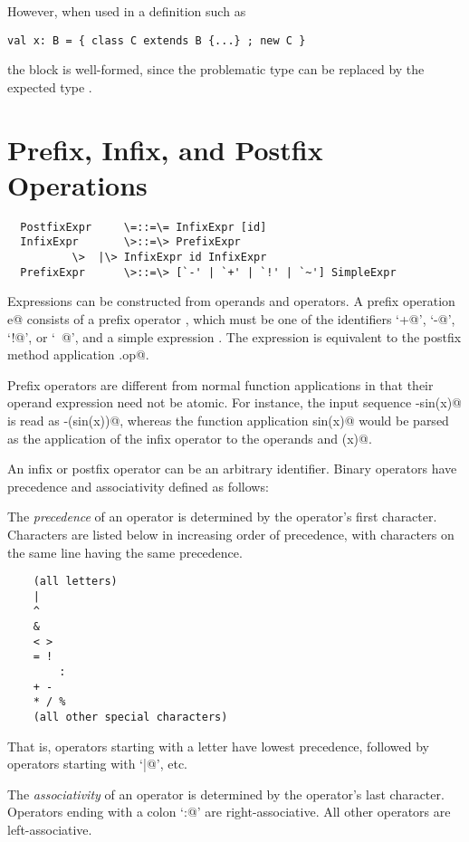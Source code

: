 \documentclass[11pt]{report}
\begin{document}
However, when used in a definition such as 
\begin{verbatim}
val x: B = { class C extends B {...} ; new C }
\end{verbatim}
the block is well-formed, since the problematic type \verb@C@ can be
replaced by the expected type \verb@B@.

\section{Prefix, Infix, and Postfix Operations}
\label{sec:infix-operations}

\syntax\begin{verbatim}
  PostfixExpr     \=::=\= InfixExpr [id]
  InfixExpr       \>::=\> PrefixExpr
		  \>  |\> InfixExpr id InfixExpr
  PrefixExpr      \>::=\> [`-' | `+' | `!' | `~'] SimpleExpr 
\end{verbatim}

Expressions can be constructed from operands and operators.  A prefix
operation \verb@op e@ consists of a prefix operator \verb@op@, which
must be one of the identifiers `\verb@+@', `\verb@-@', `\verb@!@', or
`\verb@~@', and a simple expression \verb@e@.  The expression is
equivalent to the postfix method application \verb@e.op@.

Prefix operators are different from normal function applications in
that their operand expression need not be atomic. For instance, the
input sequence \verb@-sin(x)@ is read as \verb@-(sin(x))@, whereas the
function application \verb@negate sin(x)@ would be parsed as the
application of the infix operator \verb@sin@ to the operands
\verb@negate@ and \verb@(x)@.

An infix or postfix operator can be an arbitrary identifier. Binary
operators have precedence and associativity defined as follows:

The {\em precedence} of an operator is determined by the operator's first
character. Characters are listed below in increasing order of
precedence, with characters on the same line having the same precedence.
\begin{verbatim}
	(all letters)
	|
	^
	&
	< >
	= !
        :
	+ -
	* / %
	(all other special characters)
\end{verbatim}
That is, operators starting with a letter have lowest precedence,
followed by operators starting with `\verb@|@', etc.

The {\em associativity} of an operator is determined by the operator's
last character.  Operators ending with a colon `\verb@:@' are
right-associative. All other operators are left-associative.
\end{document}
